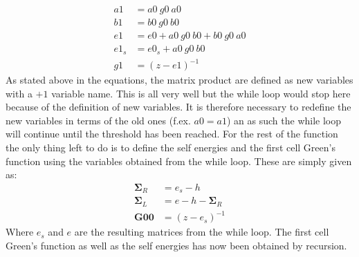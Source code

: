\begin{align*}
a1 &= a0\ g0\ a0\\
b1 &= b0\ g0\ b0\\
e1 &= e0 + a0\ g0\ b0 + b0\ g0\ a0 \\
e1_{s} &= e0_{s} + a0\ g0\ b0 \\
g1 &= (z - e1)^{-1}
\end{align*}
As stated above in the equations, the matrix product are defined as new variables with a \(+1\) variable name. This is all very well but the while loop would stop here because of the definition of new variables. It is therefore necessary to redefine the new variables in terms of the old ones (f.ex. \(a0 = a1\)) an as such the while loop will continue until the threshold has been reached. For the rest of the function the only thing left to do is to define the self energies and the first cell Green's function using the variables obtained from the while loop. These are simply given as: 
\begin{align*}\label{\outputs}
    \mathbf{\Sigma}_R &= e_s - h \\
    \mathbf{\Sigma}_L &= e - h - \mathbf{\Sigma}_R \\
    \mathbf{G00} &= (z - e_s)^{-1}
\end{align*}
Where \(e_s\) and \(e\) are the resulting matrices from the while loop. The first cell Green's function as well as the self energies has now been obtained by recursion. 
